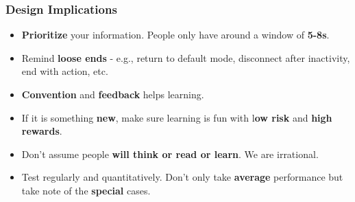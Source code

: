 \documentclass{beamer}
\begin{document}
\begin{frame}
	\frametitle{Design Implications}
	\begin{itemize}
			\item \textbf{Prioritize} your information.   People only have around a window of \textbf{5-8s}.
			\item Remind\textbf{ loose ends} - e.g., return to default mode, disconnect after inactivity, end with action, etc.
			\item \textbf{Convention} and \textbf{feedback} helps learning.
			\item If it is something \textbf{new}, make sure learning is fun with l\textbf{ow risk }and \textbf{high rewards}.
			\item Don't assume people \textbf{will think or read or learn}.  We are irrational.
			\item Test regularly and quantitatively.   Don't only take \textbf{average} performance but take note of the \textbf{special} cases.
	\end{itemize}
\end{frame}

%
%		
%		
%
%		
\end{document}
